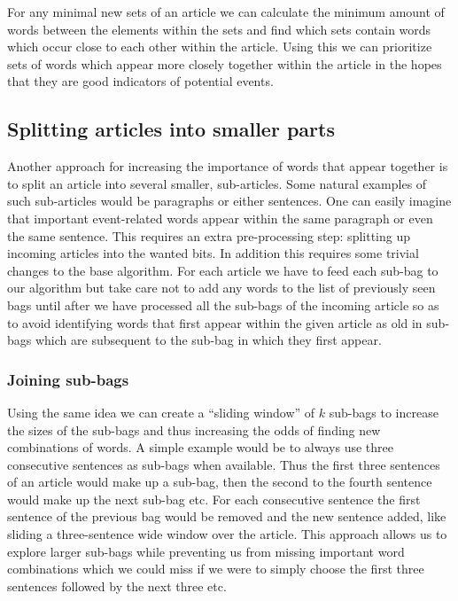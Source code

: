 For any minimal new sets of an article we can calculate the minimum amount of words between the elements within the sets and find which sets contain words which occur close to each other within the article. Using this we can prioritize sets of words which appear more closely together within the article in the hopes that they are good indicators of potential events.

\subsection{Splitting articles into smaller parts}
Another approach for increasing the importance of words that appear together is to split an article into several smaller, sub-articles. Some natural examples of such sub-articles would be paragraphs or either sentences. One can easily imagine that important event-related words appear within the same paragraph or even the same sentence. This requires an extra pre-processing step: splitting up incoming articles into the wanted bits. In addition this requires some trivial changes to the base algorithm. For each article we have to feed each sub-bag to our algorithm but take care not to add any words to the list of previously seen bags until after we have processed all the sub-bags of the incoming article so as to avoid identifying words that first appear within the given article as old in sub-bags which are subsequent to the sub-bag in which they first appear.

\subsubsection{Joining sub-bags}
Using the same idea we can create a ``sliding window'' of $k$ sub-bags to increase the sizes of the sub-bags and thus increasing the odds of finding new combinations of words. A simple example would be to always use three consecutive sentences as sub-bags when available. Thus the first three sentences of an article would make up a sub-bag, then the second to the fourth sentence would make up the next sub-bag etc. For each consecutive sentence the first sentence of the previous bag would be removed and the new sentence added, like sliding a three-sentence wide window over the article. This approach allows us to explore larger sub-bags while preventing us from missing important word combinations which we could miss if we were to simply choose the first three sentences followed by the next three etc.
